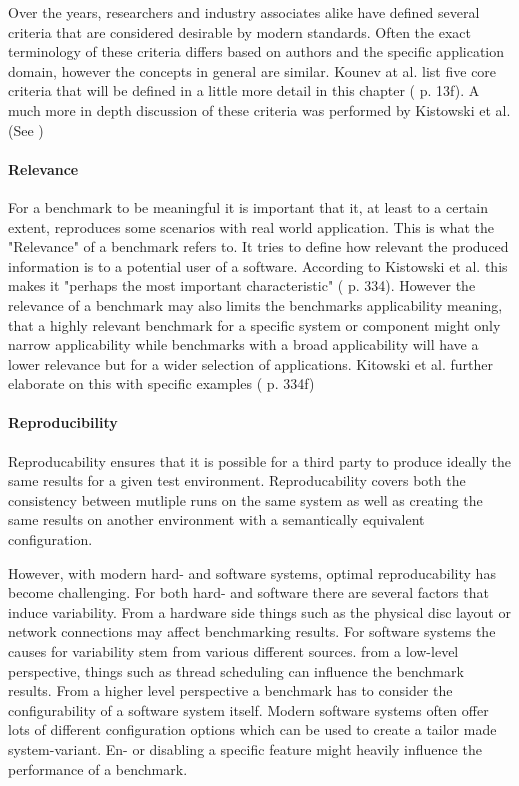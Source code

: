 \documentclass[	runningheads,
				a4paper]{llncs}
\begin{document}
Over the years, researchers and industry associates alike have defined several criteria that are considered desirable by modern standards. Often the exact terminology of these criteria differs based on authors and the specific application domain, however the concepts in general are similar. Kounev at al. list five core criteria that will be defined in a little more detail in this chapter (\cite{Kounev} p. 13f). A much more in depth discussion of these criteria was performed by Kistowski et al. (See \cite{kistowski2015})

\paragraph{Relevance} For a benchmark to be meaningful it is important that it, at least to a certain extent, reproduces some scenarios with real world application. This is what the "Relevance" of a benchmark refers to. It tries to define how relevant the produced information is to a potential user of a software. According to Kistowski et al. this makes it "perhaps the most important characteristic" (\cite{kistowski2015} p. 334). However the relevance of a benchmark may also limits the benchmarks applicability meaning, that a highly relevant benchmark for a specific system or component might only narrow applicability while benchmarks with a broad applicability will have a lower relevance but for a wider selection of applications. Kitowski et al. further elaborate on this with specific examples (\cite{kitowski2015} p. 334f)

\paragraph{Reproducibility} Reproducability ensures that it is possible for a third party to produce ideally the same results for a given test environment. Reproducability covers both the consistency between mutliple runs on the same system as well as creating the same results on another environment with a semantically equivalent configuration. 

However, with modern hard- and software systems, optimal reproducability has become challenging. For both hard- and software there are several factors that induce variability. From a hardware side things such as the physical disc layout or network connections may affect benchmarking results. For software systems the causes for variability stem from various different sources. from a low-level perspective, things such as thread scheduling can influence the benchmark results. From a higher level perspective a benchmark has to consider the configurability of a software system itself. Modern software systems often offer lots of different configuration options which can be used to create a tailor made system-variant. En- or disabling a specific feature might heavily influence the performance of a benchmark.
\end{document}

